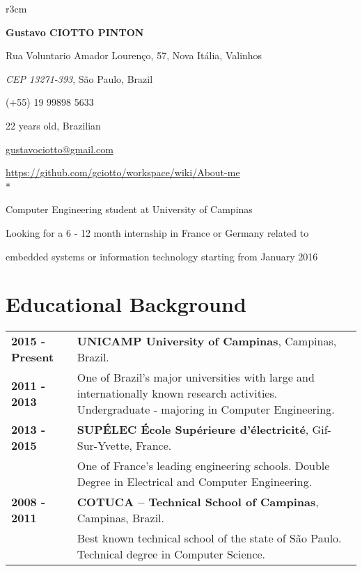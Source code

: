 \documentclass[10pt, a4paper]{article}
\author{Gustavo Ciotto Pinton}
\begin{document}
\pagestyle{empty} 

\begin{wrapfigure}{r}{3cm}
  \vspace{-20pt}
  \begin{center}
  \end{center}
\end{wrapfigure}

\textbf{\LARGE Gustavo CIOTTO PINTON}

Rua Voluntario Amador Lourenço, 57, Nova Itália, Valinhos

\textit{CEP 13271-393}, São Paulo, Brazil

(+55) 19 99898 5633	

22 years old, Brazilian

\url{gustavociotto@gmail.com} 

\url{https://github.com/gciotto/workspace/wiki/About-me}\\*

{\centerline {\large Computer Engineering student at University of Campinas}} 

{\centerline {Looking for a 6 - 12 month internship in France or Germany
related to } }

{\centerline {embedded systems or information technology starting from January
2016 } }


\section{Educational Background}

\begin{tabular}{p{} p{}}

 \textbf{2015 - Present} & \textbf{UNICAMP University of
 Campinas}, Campinas, Brazil.
 \\
 \textbf{2011 - 2013} & One of Brazil’s major universities with large and
 internationally known research activities. Undergraduate -  majoring in
 Computer Engineering.
 \\

 \textbf{2013 - 2015} & \textbf{SUPÉLEC  École Supérieure d'électricité},
 Gif-Sur-Yvette, France. \\
 & One of France's leading engineering schools. Double Degree
 in Electrical and Computer Engineering. \\

 
 \textbf{2008 - 2011} & \textbf{COTUCA – Technical School of Campinas},
 Campinas, Brazil. \\
 & Best known technical school of the state of São Paulo. Technical degree in
 Computer Science.  \\
\end{tabular}
\end{document}
